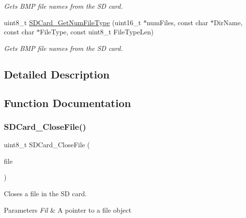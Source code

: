 \begin{DoxyCompactItemize}
\begin{DoxyCompactList}\small\item\em Gets B\+MP file names from the SD card. \end{DoxyCompactList}\item 
uint8\+\_\+t \hyperlink{group___s_d_c_a_r_d___m_o_d_u_l_e___functions_ga8acfb5338f17444e1ba8f51234cc0c5e}{S\+D\+Card\+\_\+\+Get\+Num\+File\+Type} (uint16\+\_\+t $\ast$num\+Files, const char $\ast$Dir\+Name, const char $\ast$File\+Type, const uint8\+\_\+t File\+Type\+Len)
\begin{DoxyCompactList}\small\item\em Gets B\+MP file names from the SD card. \end{DoxyCompactList}\end{DoxyCompactItemize}


\subsection{Detailed Description}


\subsection{Function Documentation}
\mbox{\label{group___s_d_c_a_r_d___m_o_d_u_l_e___functions_gabc2c13ff7f461c265d71cbafa5e1366f}} 
\subsubsection{\texorpdfstring{S\+D\+Card\+\_\+\+Close\+File()}{SDCard\_CloseFile()}}
{\footnotesize\ttfamily uint8\+\_\+t S\+D\+Card\+\_\+\+Close\+File (\begin{DoxyParamCaption}\item[{\hyperlink{struct_f_i_l}{F\+IL} $\ast$}]{file }\end{DoxyParamCaption})}



Closes a file in the SD card. 


\begin{DoxyParams}{Parameters}
{\em Fil} & A pointer to a file object \\
\hline
\end{DoxyParams}

